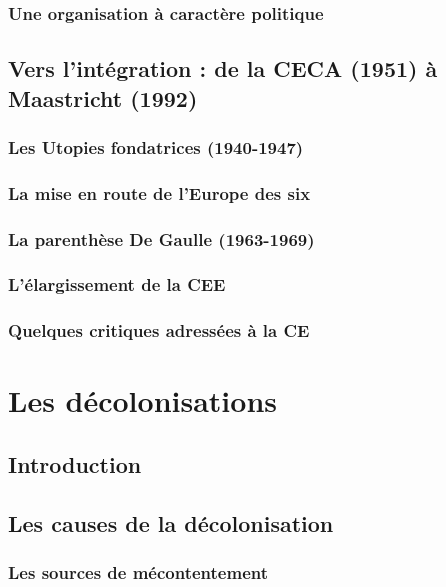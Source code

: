 \documentclass[12pt]{report}
\begin{document}
\subsection{Une organisation à caractère politique}

\section{Vers l'intégration : de la CECA (1951) à Maastricht (1992)}

\subsection{Les Utopies fondatrices (1940-1947)}

\subsection{La mise en route de l'Europe des six}

\subsection{La parenthèse De Gaulle (1963-1969)}

\subsection{L'élargissement de la CEE}

\subsection{Quelques critiques adressées à la CE}


\chapter{Les décolonisations}

\section*{Introduction}

\section{Les causes de la décolonisation}

\subsection{Les sources de mécontentement}
\end{document}
